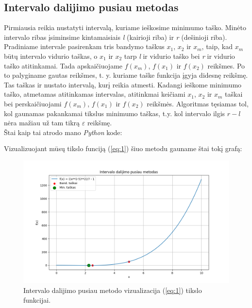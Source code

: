 \documentclass{article}
\begin{document}
\subsection{Intervalo dalijimo pusiau metodas}
Pirmiausia reikia nustatyti intervalą, kuriame ieškosime minimumo taško. Minėto intervalo ribas įsiminsime kintamaisiais \textit{l} (kairioji riba) ir \textit{r} (dešinioji riba). Pradiniame intervale pasirenkam tris bandymo taškus $x_{1}$, $x_{2}$ ir $x_{m}$, taip, kad $x_{m}$ būtų intervalo vidurio taškas, o $x_{1}$ ir $x_{2}$ tarp \textit{l} ir vidurio taško bei \textit{r} ir vidurio taško atitinkamai. Tada apskaičiuojame $f(x_{m})$, $f(x_{1})$ ir $f(x_{2})$ reikšmes. Po to palyginame gautas reikšmes, t. y. kuriame taške funkcija įgyja didesnę reikšmę. Tas taškas ir nustato intervalą, kurį reikia atmesti. Kadangi ieškome minimumo taško, atmetamas atitinkamas intervalas, atitinkmai keičiami $x_{1}$, $x_{2}$ ir $x_{m}$ taškai bei perskaičiuojami $f(x_{m})$, $f(x_{1})$ ir $f(x_{2})$ reikšmės. Algoritmas tęsiamas tol, kol gaunamas pakankamai tikslus minimumo taškas, t.y. kol intervalo ilgis $r-l$ nėra mažiau už tam tikrą $\varepsilon$ reikšmę.\\
Štai kaip tai atrodo mano \textit{Python} kode:

Vizualizuojant mūsų tikslo funciją (\ref{eq:1}) šiuo metodu gauname štai tokį grafą:
\begin{figure}[H]
    \centering
    \includegraphics[width=1\textwidth]{Figure_1.png}
    \caption{Intervalo dalijimo pusiau metodo vizualizacija (\ref{eq:1}) tikslo funkcijai.}
    \label{fig:1}
\end{figure}
\end{document}
